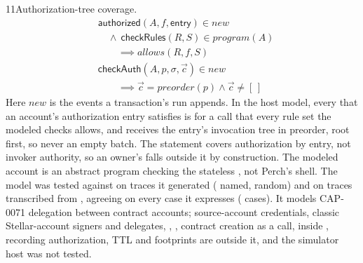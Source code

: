 \begin{perchstatement}{11}{Authorization-tree coverage.}\label{stmt:authorization-tree-coverage}
\[\begin{aligned}&\mathsf{authorized}(A, f, \mathsf{entry}) \in \mathit{new}\\
&\quad \land\ \mathsf{checkRules}(R, S) \in \mathit{program}(A)\\
&\qquad \implies \mathit{allows}(R, f, S)\\
&\mathsf{checkAuth}(A, p, \sigma, \vec c) \in \mathit{new}\\
&\qquad \implies \vec c = \mathit{preorder}(p) \land \vec c \neq [\,]\end{aligned}\]
Here \(\mathit{new}\) is the events a transaction's run appends. In the host model, every  that an account's authorization entry satisfies is for a call that every rule set the modeled  checks allows, and  receives the entry's invocation tree in preorder, root first, so never an empty batch. The statement covers authorization by entry, not invoker authority, so an owner's  falls outside it by construction. The modeled account is an abstract program checking the stateless , not Perch's shell. The model was tested against  on  traces it generated ( named,  random) and on  traces transcribed from , agreeing on every case it expresses ( cases). It models CAP-0071 delegation between contract accounts; source-account credentials, classic Stellar-account signers and delegates, , , contract creation as a call,  inside , recording authorization, TTL and footprints are outside it, and the simulator host  was not tested.
\end{perchstatement}
